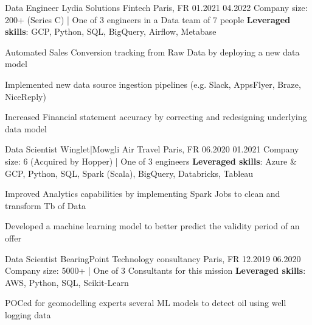\begin{cventries}
\cventry
{Data Engineer} %
{Lydia Solutions} %
{Fintech} %
{Paris, FR} %
{01.2021} %
{04.2022} %
{Company size: 200+ (Series C) | One of 3 engineers in a Data team of 7 people} %
{\textbf{Leveraged skills}: GCP, Python, SQL, BigQuery, Airflow, Metabase} %
{
  \begin{cvitems} %
    \item {Automated Sales Conversion tracking from Raw Data by deploying a new data model}
    \item {Implemented new data source ingestion pipelines (e.g. Slack, AppsFlyer, Braze, NiceReply)}
    \item {Increased Financial statement accuracy by correcting and redesigning underlying data model}
  \end{cvitems}
}

  \cventry
    {Data Scientist} %
    {Winglet|Mowgli} %
    {Air Travel} %
    {Paris, FR} %
    {06.2020} %
    {01.2021} %
    {Company size: 6 (Acquired by Hopper) | One of 3 engineers  } %
    {\textbf{Leveraged skills}: Azure \& GCP, Python, SQL, Spark (Scala), BigQuery, Databricks, Tableau} %
    {
      \begin{cvitems} %
       \item {Improved Analytics capabilities by implementing Spark Jobs to clean and transform Tb of Data}
       \item {Developed a machine learning model to better predict the validity period of an offer}
      \end{cvitems}
    }

  \cventry
  {Data Scientist} %
  {BearingPoint} %
  {Technology consultancy} %
  {Paris, FR} %
  {12.2019} %
  {06.2020} %
  {Company size: 5000+ | One of 3 Consultants for this mission} %
  {\textbf{Leveraged skills}: AWS, Python, SQL, Scikit-Learn} %
  {
    \begin{cvitems} %
     \item {POCed for geomodelling experts several ML models to detect oil using well logging data }
    \end{cvitems}
  }


\end{cventries}
